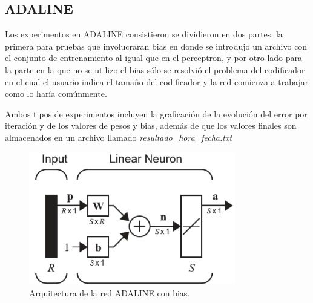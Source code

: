 \documentclass[12pt, titlepage]{article}
\begin{document}
        \subsection{ADALINE}
        Los experimentos en ADALINE consistieron se dividieron en dos partes, la primera para pruebas que involucraran bias en donde se introdujo un archivo con el conjunto de entrenamiento al igual que en el perceptron, y por otro lado para la parte en la que no se utilizo el bias sólo se resolvió el problema del codificador en el cual el usuario indica el tamaño del codificador y la red comienza a trabajar como lo haría comúnmente.
        
        Ambos tipos de experimentos incluyen la graficación de la evolución del error por iteración y de los valores de pesos y bias, además de que los valores finales son almacenados en un archivo llamado \emph{resultado\_hora\_fecha.txt}
        \begin{figure}[H]
            \begin{center}
                \includegraphics[width=9cm]{img/adaline/arquitectura.png}
                \caption{Arquitectura de la red ADALINE con bias. \cite{libro1}}
                \label{fig:adaline-diagrama2}
            \end{center}
        \end{figure}
\end{document}
